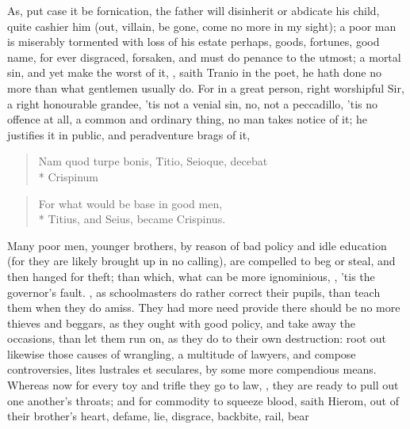{As, put case it be fornication, the father will disinherit or abdicate
his child, quite cashier him (out, villain, be gone, come no more in my
sight); a poor man is miserably tormented with loss of his estate
perhaps, goods, fortunes, good name, for ever disgraced, forsaken, and
must do penance to the utmost; a mortal sin, and yet make the worst of
it, , saith Tranio in the poet,  he hath done no more than what gentlemen
usually do.  For in a great person, right worshipful Sir, a right honourable
grandee, 'tis not a venial sin, no, not a peccadillo, 'tis no offence
at all, a common and ordinary thing, no man takes notice of it; he
justifies it in public, and peradventure brags of it,
%
\begin{latin}
\begin{verse}
Nam quod turpe bonis, Titio, Seioque, decebat\\*
Crispinum
\end{verse}
\end{latin}
\translationrule
\begin{verse}
For what would be base in good men,\\*
Titius, and Seius, became Crispinus.
\end{verse}
%
%
Many poor men, younger brothers, \etc{} by reason of bad policy and
idle education (for they are likely brought up in no calling), are
compelled to beg or steal, and then hanged for theft; than which, what
can be more ignominious, , 'tis the governor's fault. , as schoolmasters do rather correct their pupils,
than teach them when they do amiss. They had more need provide
there should be no more thieves and beggars, as they ought with good
policy, and take away the occasions, than let them run on, as they do
to their own destruction: root out likewise those causes of wrangling,
a multitude of lawyers, and compose controversies, lites lustrales et
seculares, by some more compendious means. Whereas now for every toy
and trifle they go to law, , they are ready to pull out one another's
throats; and for commodity to squeeze blood, saith Hierom, out of
their brother's heart, defame, lie, disgrace, backbite, rail, bear
}
